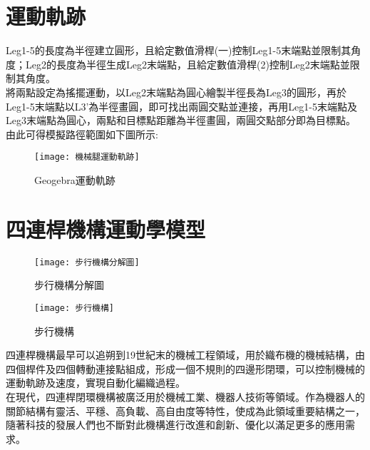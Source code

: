 
\section{運動軌跡}
Leg1-5的長度為半徑建立圓形，且給定數值滑桿(一)控制Leg1-5末端點並限制其角度；Leg2的長度為半徑生成Leg2末端點，且給定數值滑桿(2)控制Leg2末端點並限制其角度。\\

將兩點設定為搖擺運動，以Leg2末端點為圓心繪製半徑長為Leg3的圓形，再於Leg1-5末端點以L3’為半徑畫圓，即可找出兩圓交點並連接，再用Leg1-5末端點及Leg3末端點為圓心，兩點和目標點距離為半徑畫圓，兩圓交點部分即為目標點。\\

由此可得模擬路徑範圍如下圖所示:\\
\begin{figure}[hbt!]
\begin{center}
\texttt{[image: 機械腿運動軌跡]}
\caption{\Large Geogebra運動軌跡}\label{機械腿運動軌跡}
\end{center}
\end{figure}

\newpage

\section{四連桿機構運動學模型}

\begin{figure}[htbp]
  \begin{minipage}[t]{0.5\linewidth}
    \centering
    \texttt{[image: 步行機構分解圖]}
    \caption{步行機構分解圖}
    \label{步行機構分解圖}
  \end{minipage}
  \hfill
  \begin{minipage}[t]{0.4\linewidth}
    \centering
    \texttt{[image: 步行機構]}
    \caption{步行機構}
    \label{步行機構}
  \end{minipage}
\end{figure}

四連桿機構最早可以追朔到19世紀末的機械工程領域，用於織布機的機械結構，由四個桿件及四個轉動連接點組成，形成一個不規則的四邊形閉環，可以控制機械的運動軌跡及速度，實現自動化編織過程。\\

在現代，四連桿閉環機構被廣泛用於機械工業、機器人技術等領域。作為機器人的關節結構有靈活、平穩、高負載、高自由度等特性，使成為此領域重要結構之一，隨著科技的發展人們也不斷對此機構進行改進和創新、優化以滿足更多的應用需求。\\

